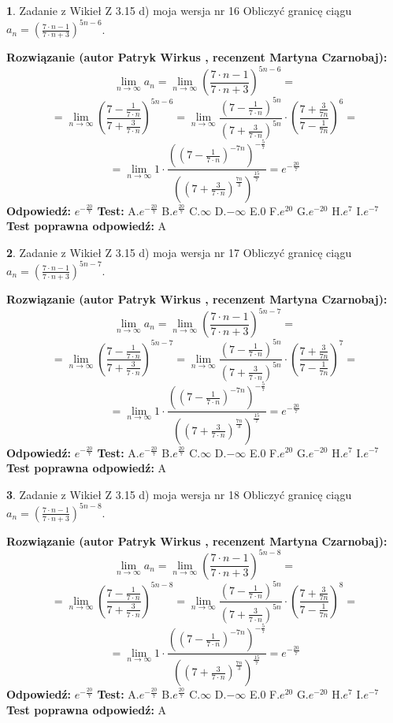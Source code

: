 \documentclass[12pt, a4paper]{article}
\theoremstyle{definition} %
\newtheorem{zad}{}
\newcommand{\zadStart}[1]{\begin{zad}#1\newline}
\newcommand{\zadStop}{\end{zad}}
\newcommand{\rozwStart}[2]{\noindent \textbf{Rozwiązanie (autor #1 , recenzent #2): }\newline}
\newcommand{\rozwStop}{\newline}
\newcommand{\odpStart}{\noindent \textbf{Odpowiedź:}\newline}
\newcommand{\odpStop}{\newline}
\newcommand{\testStart}{\noindent \textbf{Test:}\newline}
\newcommand{\testStop}{\newline}
\newcommand{\kluczStart}{\noindent \textbf{Test poprawna odpowiedź:}\newline}
\newcommand{\kluczStop}{\newline}
\begin{document}
\zadStart{Zadanie z Wikieł Z 3.15 d) moja wersja nr 16}
Obliczyć granicę ciągu $a_{n}=(\frac{7\cdot n - 1}{7 \cdot n + 3})^{5n-6}$.
\zadStop
\rozwStart{Patryk Wirkus}{Martyna Czarnobaj}
$$\lim\limits_{n\to\infty} a_{n} = \lim\limits_{n\to\infty}(\frac{7\cdot n - 1}{7 \cdot n + 3})^{5n-6}=$$
$$=\lim\limits_{n\to\infty}(\frac{7 - \frac{1}{7\cdot n}}{7 + \frac{3}{7 \cdot n}})^{5n-6}=\lim\limits_{n\to\infty}\frac{(7 - \frac{1}{7\cdot n})^{5n}}{(7 + \frac{3}{7\cdot n})^{5n}} \cdot (\frac{7+\frac{3}{7n}}{7-\frac{1}{7n}})^{6}=$$
$$=\lim\limits_{n\to\infty} 1 \cdot \frac{((7-\frac{1}{7 \cdot n})^{-7n})^{-\frac{5}{7}}}{((7+\frac{3}{7 \cdot n})^{\frac{7n}{3}})^{\frac{15}{7}}} =e^{-\frac{20}{7}}$$
\rozwStop
\odpStart
$e^{-\frac{20}{7}}$
\odpStop
\testStart
A.$ e^{-\frac{20}{7}}$
B.$ e^{\frac{20}{7}}$
C.$\infty$
D.$-\infty$
E.$0$
F.$e^{20}$
G.$e^{-20}$
H.$e^{7}$
I.$e^{-7}$
\testStop
\kluczStart
A
\kluczStop



\zadStart{Zadanie z Wikieł Z 3.15 d) moja wersja nr 17}
Obliczyć granicę ciągu $a_{n}=(\frac{7\cdot n - 1}{7 \cdot n + 3})^{5n-7}$.
\zadStop
\rozwStart{Patryk Wirkus}{Martyna Czarnobaj}
$$\lim\limits_{n\to\infty} a_{n} = \lim\limits_{n\to\infty}(\frac{7\cdot n - 1}{7 \cdot n + 3})^{5n-7}=$$
$$=\lim\limits_{n\to\infty}(\frac{7 - \frac{1}{7\cdot n}}{7 + \frac{3}{7 \cdot n}})^{5n-7}=\lim\limits_{n\to\infty}\frac{(7 - \frac{1}{7\cdot n})^{5n}}{(7 + \frac{3}{7\cdot n})^{5n}} \cdot (\frac{7+\frac{3}{7n}}{7-\frac{1}{7n}})^{7}=$$
$$=\lim\limits_{n\to\infty} 1 \cdot \frac{((7-\frac{1}{7 \cdot n})^{-7n})^{-\frac{5}{7}}}{((7+\frac{3}{7 \cdot n})^{\frac{7n}{3}})^{\frac{15}{7}}} =e^{-\frac{20}{7}}$$
\rozwStop
\odpStart
$e^{-\frac{20}{7}}$
\odpStop
\testStart
A.$ e^{-\frac{20}{7}}$
B.$ e^{\frac{20}{7}}$
C.$\infty$
D.$-\infty$
E.$0$
F.$e^{20}$
G.$e^{-20}$
H.$e^{7}$
I.$e^{-7}$
\testStop
\kluczStart
A
\kluczStop



\zadStart{Zadanie z Wikieł Z 3.15 d) moja wersja nr 18}
Obliczyć granicę ciągu $a_{n}=(\frac{7\cdot n - 1}{7 \cdot n + 3})^{5n-8}$.
\zadStop
\rozwStart{Patryk Wirkus}{Martyna Czarnobaj}
$$\lim\limits_{n\to\infty} a_{n} = \lim\limits_{n\to\infty}(\frac{7\cdot n - 1}{7 \cdot n + 3})^{5n-8}=$$
$$=\lim\limits_{n\to\infty}(\frac{7 - \frac{1}{7\cdot n}}{7 + \frac{3}{7 \cdot n}})^{5n-8}=\lim\limits_{n\to\infty}\frac{(7 - \frac{1}{7\cdot n})^{5n}}{(7 + \frac{3}{7\cdot n})^{5n}} \cdot (\frac{7+\frac{3}{7n}}{7-\frac{1}{7n}})^{8}=$$
$$=\lim\limits_{n\to\infty} 1 \cdot \frac{((7-\frac{1}{7 \cdot n})^{-7n})^{-\frac{5}{7}}}{((7+\frac{3}{7 \cdot n})^{\frac{7n}{3}})^{\frac{15}{7}}} =e^{-\frac{20}{7}}$$
\rozwStop
\odpStart
$e^{-\frac{20}{7}}$
\odpStop
\testStart
A.$ e^{-\frac{20}{7}}$
B.$ e^{\frac{20}{7}}$
C.$\infty$
D.$-\infty$
E.$0$
F.$e^{20}$
G.$e^{-20}$
H.$e^{7}$
I.$e^{-7}$
\testStop
\kluczStart
A
\kluczStop
\end{document}
